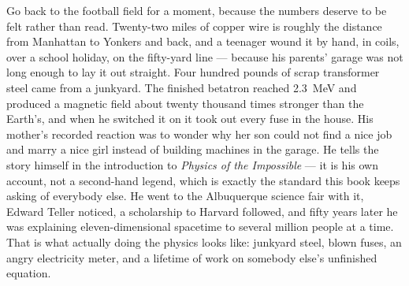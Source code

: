\begin{funfact}
Go back to the football field for a moment, because the numbers deserve to be felt rather than
read. Twenty-two miles of copper wire is roughly the distance from Manhattan to Yonkers and back,
and a teenager wound it by hand, in coils, over a school holiday, on the fifty-yard line ---
because his parents' garage was not long enough to lay it out straight. Four hundred pounds of
scrap transformer steel came from a junkyard. The finished betatron reached 2.3~MeV and produced a
magnetic field about twenty thousand times stronger than the Earth's, and when he switched it on it
took out every fuse in the house. His mother's recorded reaction was to wonder why her son could
not find a nice job and marry a nice girl instead of building machines in the garage. He tells the
story himself in the introduction to \emph{Physics of the Impossible} --- it is his own account, not
a second-hand legend, which is exactly the standard this book keeps asking of everybody else. He
went to the Albuquerque science fair with it, Edward Teller noticed, a scholarship to Harvard
followed, and
fifty years later he was explaining eleven-dimensional spacetime to several million people at a
time.  That is what actually doing the physics looks like: junkyard steel,
blown fuses, an angry electricity meter, and a lifetime of work on somebody else's unfinished
equation.
\end{funfact}

